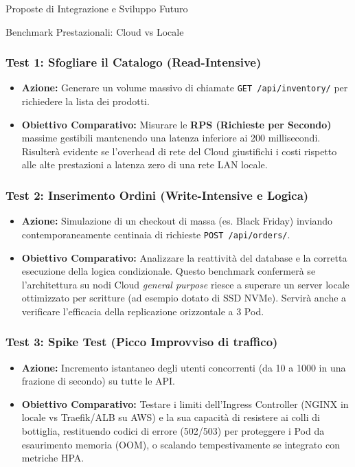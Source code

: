 \begin{mychapter}{Proposte di Integrazione e Sviluppo Futuro}
\begin{mysection}{Benchmark Prestazionali: Cloud vs Locale}
\subsubsection*{Test 1: Sfogliare il Catalogo (Read-Intensive)}
\begin{itemize}
    \item \textbf{Azione:} Generare un volume massivo di chiamate \texttt{GET /api/inventory/} per richiedere la lista dei prodotti.
    \item \textbf{Obiettivo Comparativo:} Misurare le \textbf{RPS (Richieste per Secondo)} massime gestibili mantenendo una latenza inferiore ai 200 millisecondi. Risulterà evidente se l'overhead di rete del Cloud giustifichi i costi rispetto alle alte prestazioni a latenza zero di una rete LAN locale.
\end{itemize}

\subsubsection*{Test 2: Inserimento Ordini (Write-Intensive e Logica)}
\begin{itemize}
    \item \textbf{Azione:} Simulazione di un checkout di massa (es. Black Friday) inviando contemporaneamente centinaia di richieste \texttt{POST /api/orders/}.
    \item \textbf{Obiettivo Comparativo:} Analizzare la reattività del database e la corretta esecuzione della logica condizionale. Questo benchmark confermerà se l'architettura su nodi Cloud \textit{general purpose} riesce a superare un server locale ottimizzato per scritture (ad esempio dotato di SSD NVMe). Servirà anche a verificare l'efficacia della replicazione orizzontale a 3 Pod.
\end{itemize}

\subsubsection*{Test 3: Spike Test (Picco Improvviso di traffico)}
\begin{itemize}
    \item \textbf{Azione:} Incremento istantaneo degli utenti concorrenti (da 10 a 1000 in una frazione di secondo) su tutte le API.
    \item \textbf{Obiettivo Comparativo:} Testare i limiti dell'Ingress Controller (NGINX in locale vs Traefik/ALB su AWS) e la sua capacità di resistere ai colli di bottiglia, restituendo codici di errore (502/503) per proteggere i Pod da esaurimento memoria (OOM), o scalando tempestivamente se integrato con metriche HPA.
\end{itemize}

\end{mysection}

\end{mychapter}
